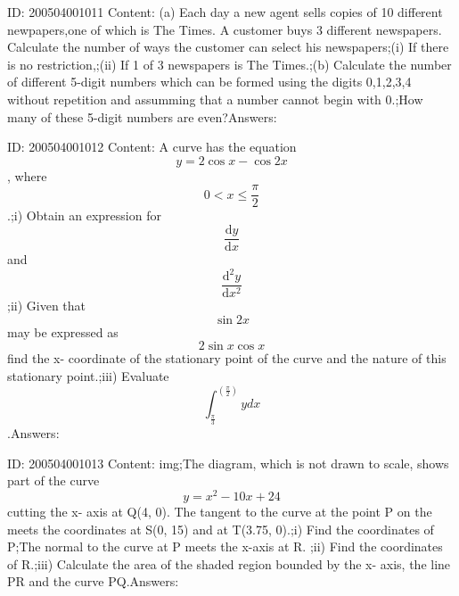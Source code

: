 \documentclass{article}
\begin{document}
ID: 200504001011
Content:
(a)	Each day a new agent sells copies of 10 different newpapers,one of which is The Times. A customer buys 3 different newspapers. Calculate the number of ways the customer can select his newspapers;(i)	If there is no restriction,;(ii)	If 1 of 3 newspapers is The Times.;(b)	Calculate the number of different 5-digit numbers which can be formed using the digits 0,1,2,3,4 without repetition and assumming that a number cannot begin with 0.;How many of these 5-digit numbers are even?Answers:

ID: 200504001012
Content:
A curve has the equation $$y = 2 \cos  x -\cos  2x$$, where $$0< x\leq\frac{\pi}{2}$$.;i) Obtain an expression for $$\frac{\mathrm{d} y}{\mathrm{d} x}$$ and $$\frac{\mathrm{d} ^{2}y}{\mathrm{d} x^{2}} $$;ii) Given that $$\sin  2x$$ may be expressed as $$2 \sin  x \cos  x$$ find the x- coordinate of the stationary point of the curve and the nature of this stationary point.;iii) Evaluate $$\int_{\frac{\pi}{3}}^{(\frac{\pi}{2})}y dx$$.Answers:

ID: 200504001013
Content:
img;The diagram, which is not drawn to scale, shows part of the curve $$y=x^2-10x+24$$ cutting the x- axis at Q(4, 0). The tangent to the curve at the point P on the meets the coordinates at S(0, 15) and at T(3.75, 0).;i) Find the coordinates of P;The normal to the curve at P meets the x-axis at R. ;ii) Find the coordinates of R.;iii) Calculate the area of the shaded region bounded by the x- axis, the line PR and the curve PQ.Answers:
\end{document}
